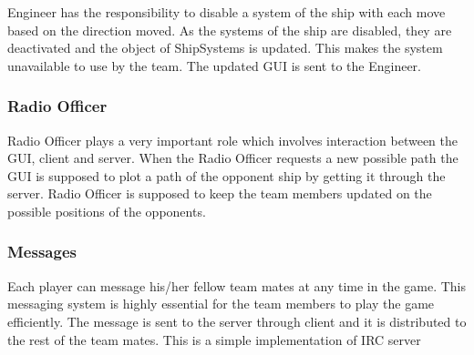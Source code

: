 Engineer has the responsibility to disable a system of the ship with each move based on the direction moved. As the systems of the ship are disabled, they are deactivated and the object of ShipSystems is updated. This makes the system unavailable to use by the team. The updated GUI is sent to the Engineer.

\subsubsection*{Radio Officer}


Radio Officer plays a very important role which involves interaction between the GUI, client and server. When the Radio Officer requests a new possible path the GUI is supposed to plot a path of the opponent ship by getting it through the server. Radio Officer is supposed to keep the team members updated on the possible positions of the opponents.

\subsubsection*{Messages}


Each player can message his/her fellow team mates at any time in the game. This messaging system is highly essential for the team members to play the game efficiently. The message is sent to the server through client and it is distributed to the rest of the team mates. This is a simple implementation of IRC server

